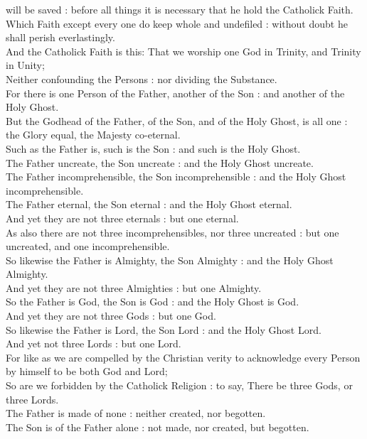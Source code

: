  will be saved : before all things it is necessary that he hold the Catholick Faith.\\
Which Faith except every one do keep whole and undefiled : without doubt he shall perish everlastingly.\\
And the Catholick Faith is this: That we worship one God in Trinity, and Trinity in Unity;\\
Neither confounding the Persons : nor dividing the Substance.\\
For there is one Person of the Father, another of the Son : and another of the Holy Ghost.\\
But the Godhead of the Father, of the Son, and of the Holy Ghost, is all one : the Glory equal, the Majesty co-eternal.\\
Such as the Father is, such is the Son : and such is the Holy Ghost.\\
The Father uncreate, the Son uncreate : and the Holy Ghost uncreate.\\
The Father incomprehensible, the Son incomprehensible : and the Holy Ghost incomprehensible.\\
The Father eternal, the Son eternal : and the Holy Ghost eternal.\\
And yet they are not three eternals : but one eternal.\\
As also there are not three incomprehensibles, nor three uncreated : but one uncreated, and one incomprehensible.\\
So likewise the Father is Almighty, the Son Almighty : and the Holy Ghost Almighty.\\
And yet they are not three Almighties : but one Almighty.\\
So the Father is God, the Son is God : and the Holy Ghost is God.\\
And yet they are not three Gods : but one God.\\
So likewise the Father is Lord, the Son Lord : and the Holy Ghost Lord.\\
And yet not three Lords : but one Lord.\\
For like as we are compelled by the Christian verity to acknowledge every Person by himself to be both God and Lord;\\
So are we forbidden by the Catholick Religion : to say, There be three Gods, or three Lords.\\
The Father is made of none : neither created, nor begotten.\\
The Son is of the Father alone : not made, nor created, but begotten.\\
